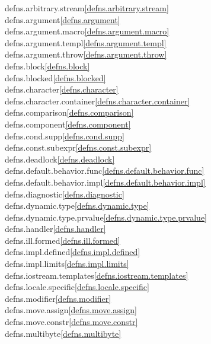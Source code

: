 \begin{multicols}{2}
defns.arbitrary.stream\quad\ref{defns.arbitrary.stream}\\
defns.argument\quad\ref{defns.argument}\\
defns.argument.macro\quad\ref{defns.argument.macro}\\
defns.argument.templ\quad\ref{defns.argument.templ}\\
defns.argument.throw\quad\ref{defns.argument.throw}\\
defns.block\quad\ref{defns.block}\\
defns.blocked\quad\ref{defns.blocked}\\
defns.character\quad\ref{defns.character}\\
defns.character.container\quad\ref{defns.character.container}\\
defns.comparison\quad\ref{defns.comparison}\\
defns.component\quad\ref{defns.component}\\
defns.cond.supp\quad\ref{defns.cond.supp}\\
defns.const.subexpr\quad\ref{defns.const.subexpr}\\
defns.deadlock\quad\ref{defns.deadlock}\\
defns.default.behavior.func\quad\ref{defns.default.behavior.func}\\
defns.default.behavior.impl\quad\ref{defns.default.behavior.impl}\\
defns.diagnostic\quad\ref{defns.diagnostic}\\
defns.dynamic.type\quad\ref{defns.dynamic.type}\\
defns.dynamic.type.prvalue\quad\ref{defns.dynamic.type.prvalue}\\
defns.handler\quad\ref{defns.handler}\\
defns.ill.formed\quad\ref{defns.ill.formed}\\
defns.impl.defined\quad\ref{defns.impl.defined}\\
defns.impl.limits\quad\ref{defns.impl.limits}\\
defns.iostream.templates\quad\ref{defns.iostream.templates}\\
defns.locale.specific\quad\ref{defns.locale.specific}\\
defns.modifier\quad\ref{defns.modifier}\\
defns.move.assign\quad\ref{defns.move.assign}\\
defns.move.constr\quad\ref{defns.move.constr}\\
defns.multibyte\quad\ref{defns.multibyte}\\

\end{multicols}
